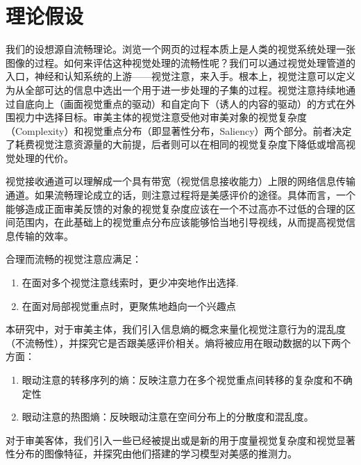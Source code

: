 \chapter{理论假设}
\label{chap:hypothesis}
我们的设想源自流畅理论。浏览一个网页的过程本质上是人类的视觉系统处理一张图像的过程。如何来评估这种视觉处理的流畅性呢？我们可以通过视觉处理管道的入口，神经和认知系统的上游——视觉注意，来入手。根本上，视觉注意可以定义为从全部可达的信息中选出一个用于进一步处理的子集的过程。视觉注意持续地通过自底向上（画面视觉重点的驱动）和自定向下（诱人的内容的驱动）的方式在外围视力中选择目标。审美主体的视觉注意受他对审美对象的视觉复杂度（Complexity）和视觉重点分布（即显著性分布，Saliency）两个部分。前者决定了耗费视觉注意资源量的大前提，后者则可以在相同的视觉复杂度下降低或增高视觉处理的代价。

视觉接收通道可以理解成一个具有带宽（视觉信息接收能力）上限的网络信息传输通道。如果流畅理论成立的话，则注意过程将是美感评价的途径。具体而言，一个能够造成正面审美反馈的对象的视觉复杂度应该在一个不过高亦不过低的合理的区间范围内，在此基础上的视觉重点分布应该能够恰当地引导视线，从而提高视觉信息传输的效率。

合理而流畅的视觉注意应满足：
\begin{enumerate}
  \item 在面对多个视觉注意线索时，更少冲突地作出选择.
  \item 在面对局部视觉重点时，更聚焦地趋向一个兴趣点
\end{enumerate}

本研究中，对于审美主体，我们引入信息熵的概念来量化视觉注意行为的混乱度（不流畅性），并探究它是否跟美感评价相关。熵将被应用在眼动数据的以下两个方面：

\begin{enumerate}
  \item 眼动注意的转移序列的熵：反映注意力在多个视觉重点间转移的复杂度和不确定性
  \item 眼动注意的热图熵：反映眼动注意在空间分布上的分散度和混乱度。
\end{enumerate}

对于审美客体，我们引入一些已经被提出或是新的用于度量视觉复杂度和视觉显著性分布的图像特征，并探究由他们搭建的学习模型对美感的推测力。
